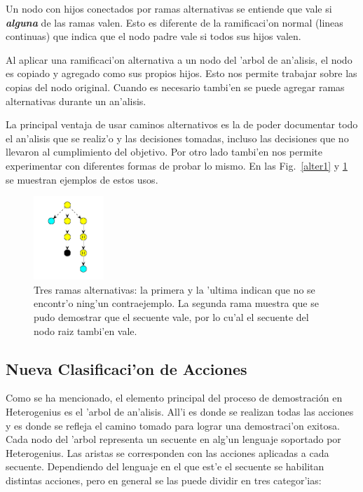 Un nodo con hijos conectados por ramas alternativas se entiende que vale si \textit{\textbf{alguna}} de las ramas valen. Esto es diferente de la ramificaci'on normal (lineas continuas) que indica que el nodo padre vale si todos sus hijos valen.

Al aplicar una ramificaci'on alternativa a un nodo del 'arbol de an'alisis, el nodo es copiado y agregado como sus propios hijos. Esto nos permite trabajar sobre las copias del nodo original. Cuando es necesario tambi'en se puede agregar ramas alternativas durante un an'alisis.
 
La principal ventaja de usar caminos alternativos es la de poder documentar todo el an'alisis que se realiz'o y las decisiones tomadas, incluso las decisiones que no llevaron al cumplimiento del objetivo. Por otro lado tambi'en nos permite experimentar con diferentes formas de probar lo mismo.
En las Fig.~\ref{alter1} y \ref{alter2} se muestran ejemplos de estos usos.

\begin{figure}[bth]
	\includegraphics[width=100px]{img/ramas_alternativas.png}
	\centering
	\caption{Tres ramas alternativas: la primera y la 'ultima indican que no se encontr'o ning'un contraejemplo. La segunda rama muestra que se pudo demostrar que el secuente vale, por lo cu'al el secuente del nodo raiz tambi'en vale.}
        \label{alter2}
\end{figure}



\subsection{Nueva Clasificaci'on de Acciones}

Como se ha mencionado, el elemento principal del proceso de demostración en Heterogenius es el 'arbol de an'alisis. All'i es donde se realizan todas las acciones y es donde se refleja el camino tomado para lograr una demostraci'on exitosa. Cada nodo del 'arbol representa un secuente en alg'un lenguaje soportado por Heterogenius. Las aristas se corresponden con las acciones aplicadas a cada secuente. Dependiendo del lenguaje en el que est'e el secuente se habilitan distintas acciones, pero en general se las puede dividir en tres categor'ias:

